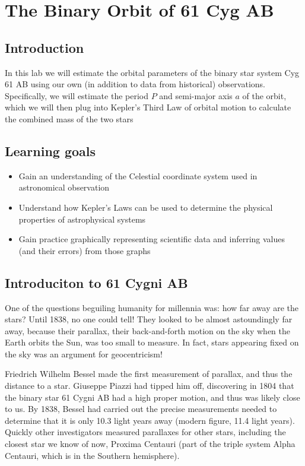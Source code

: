 \chapter{The Binary Orbit of 61 Cyg AB}

\section{Introduction}

In this lab we will estimate the orbital parameters of the binary star system Cyg 61 AB using our own (in addition to data from historical) observations. Specifically, we will estimate the period $P$ and semi-major axis $a$ of the orbit, which we will then plug into Kepler's Third Law of orbital motion to calculate the combined mass of the two stars

\section{Learning goals}

\begin{itemize}
\item Gain an understanding of the Celestial coordinate system used in astronomical observation
\item Understand how Kepler's Laws can be used to determine the physical properties of astrophysical systems
\item Gain practice graphically representing scientific data and inferring values (and their errors) from those graphs
\end{itemize}

\section{Introduciton to 61 Cygni AB}
One of the questions beguiling humanity for millennia was: how far away are the stars?  Until 1838, no one could tell!  They looked to be almost astoundingly far away, because their parallax, their back-and-forth motion on the sky when the Earth orbits the Sun, was too small to measure.  In fact, stars appearing fixed on the sky was an argument for geocentricism!

Friedrich Wilhelm Bessel made the first measurement of parallax, and thus the distance to a star. Giuseppe Piazzi had tipped him off, discovering in 1804 that the binary star 61 Cygni AB had a high proper motion, and thus was likely close to us. By 1838, Bessel had carried out the precise measurements needed to determine that it is only 10.3 light years away (modern figure, 11.4 light years).  Quickly other investigators measured parallaxes for other stars, including the closest star we know of now, Proxima Centauri (part of the triple system Alpha Centauri, which is in the Southern hemisphere).  %

